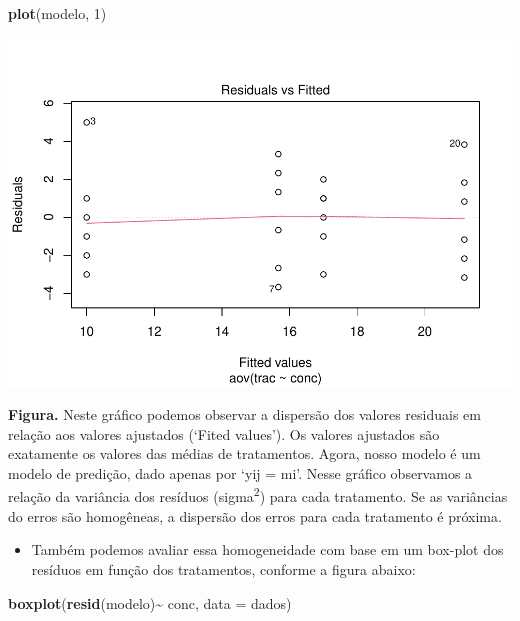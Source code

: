 \documentclass[
]{book}
\newenvironment{Shaded}{\begin{snugshade}}{\end{snugshade}}
\newcommand{\AttributeTok}[1]{\textcolor[rgb]{0.13,0.29,0.53}{#1}}
\newcommand{\DecValTok}[1]{\textcolor[rgb]{0.00,0.00,0.81}{#1}}
\newcommand{\FunctionTok}[1]{\textcolor[rgb]{0.13,0.29,0.53}{\textbf{#1}}}
\newcommand{\NormalTok}[1]{#1}
\newcommand{\SpecialCharTok}[1]{\textcolor[rgb]{0.81,0.36,0.00}{\textbf{#1}}}
\providecommand{\tightlist}{%
  \setlength{\itemsep}{0pt}\setlength{\parskip}{0pt}}
\begin{document}
\begin{Shaded}
\begin{Highlighting}[]
\FunctionTok{plot}\NormalTok{(modelo, }\DecValTok{1}\NormalTok{)}
\end{Highlighting}
\end{Shaded}

\includegraphics{_main_files/figure-latex/anova3-1.pdf}

\textbf{Figura.} Neste gráfico podemos observar a dispersão dos valores residuais em relação aos valores ajustados (`Fited values'). Os valores ajustados são exatamente os valores das médias de tratamentos. Agora, nosso modelo é um modelo de predição, dado apenas por `yij = mi'. Nesse gráfico observamos a relação da variância dos resíduos (sigma\textsuperscript{2}) para cada tratamento. Se as variâncias do erros são homogêneas, a dispersão dos erros para cada tratamento é próxima.

\begin{itemize}
\tightlist
\item
  Também podemos avaliar essa homogeneidade com base em um box-plot dos resíduos em função dos tratamentos, conforme a figura abaixo:
\end{itemize}

\begin{Shaded}
\begin{Highlighting}[]
\FunctionTok{boxplot}\NormalTok{(}\FunctionTok{resid}\NormalTok{(modelo)}\SpecialCharTok{\textasciitilde{}}\NormalTok{ conc, }\AttributeTok{data =}\NormalTok{ dados)}
\end{Highlighting}
\end{Shaded}
\end{document}
